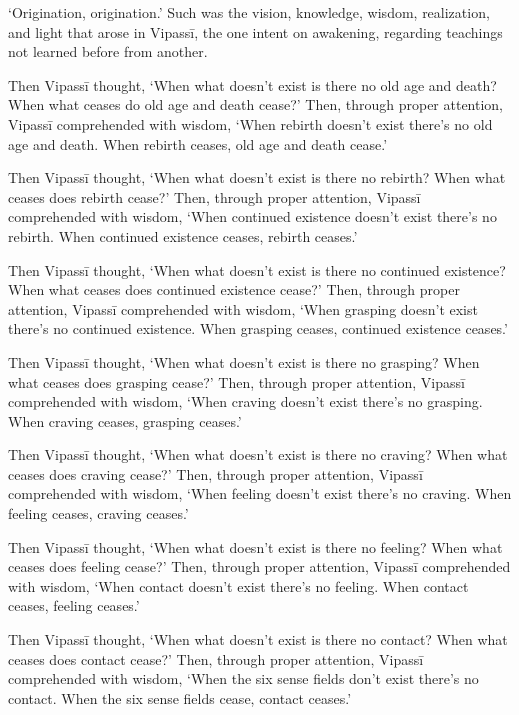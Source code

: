 \documentclass[12pt,openany]{book}%
\begin{document}
‘Origination, origination.’ Such was the vision, knowledge, wisdom, realization, and light that arose in \textsanskrit{Vipassī}, the one intent on awakening, regarding teachings not learned before from another. 

Then \textsanskrit{Vipassī} thought, ‘When what doesn’t exist is there no old age and death? When what ceases do old age and death cease?’ Then, through proper attention, \textsanskrit{Vipassī} comprehended with wisdom, ‘When rebirth doesn’t exist there’s no old age and death. When rebirth ceases, old age and death cease.’ 

Then \textsanskrit{Vipassī} thought, ‘When what doesn’t exist is there no rebirth? When what ceases does rebirth cease?’ Then, through proper attention, \textsanskrit{Vipassī} comprehended with wisdom, ‘When continued existence doesn’t exist there’s no rebirth. When continued existence ceases, rebirth ceases.’ 

Then \textsanskrit{Vipassī} thought, ‘When what doesn’t exist is there no continued existence? When what ceases does continued existence cease?’ Then, through proper attention, \textsanskrit{Vipassī} comprehended with wisdom, ‘When grasping doesn’t exist there’s no continued existence. When grasping ceases, continued existence ceases.’ 

Then \textsanskrit{Vipassī} thought, ‘When what doesn’t exist is there no grasping? When what ceases does grasping cease?’ Then, through proper attention, \textsanskrit{Vipassī} comprehended with wisdom, ‘When craving doesn’t exist there’s no grasping. When craving ceases, grasping ceases.’ 

Then \textsanskrit{Vipassī} thought, ‘When what doesn’t exist is there no craving? When what ceases does craving cease?’ Then, through proper attention, \textsanskrit{Vipassī} comprehended with wisdom, ‘When feeling doesn’t exist there’s no craving. When feeling ceases, craving ceases.’ 

Then \textsanskrit{Vipassī} thought, ‘When what doesn’t exist is there no feeling? When what ceases does feeling cease?’ Then, through proper attention, \textsanskrit{Vipassī} comprehended with wisdom, ‘When contact doesn’t exist there’s no feeling. When contact ceases, feeling ceases.’ 

Then \textsanskrit{Vipassī} thought, ‘When what doesn’t exist is there no contact? When what ceases does contact cease?’ Then, through proper attention, \textsanskrit{Vipassī} comprehended with wisdom, ‘When the six sense fields don’t exist there’s no contact. When the six sense fields cease, contact ceases.’ 
\end{document}
